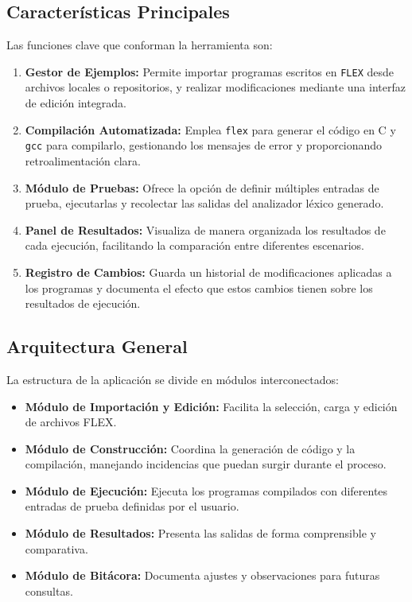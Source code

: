 \documentclass{article}
\begin{document}
\subsection*{Características Principales}

Las funciones clave que conforman la herramienta son:

\begin{enumerate}
    \item \textbf{Gestor de Ejemplos:} Permite importar programas escritos en \texttt{FLEX} desde archivos locales o repositorios, y realizar modificaciones mediante una interfaz de edición integrada.
    \item \textbf{Compilación Automatizada:} Emplea \texttt{flex} para generar el código en C y \texttt{gcc} para compilarlo, gestionando los mensajes de error y proporcionando retroalimentación clara.
    \item \textbf{Módulo de Pruebas:} Ofrece la opción de definir múltiples entradas de prueba, ejecutarlas y recolectar las salidas del analizador léxico generado.
    \item \textbf{Panel de Resultados:} Visualiza de manera organizada los resultados de cada ejecución, facilitando la comparación entre diferentes escenarios.
    \item \textbf{Registro de Cambios:} Guarda un historial de modificaciones aplicadas a los programas y documenta el efecto que estos cambios tienen sobre los resultados de ejecución.
\end{enumerate}

\subsection*{Arquitectura General}

La estructura de la aplicación se divide en módulos interconectados:

\begin{itemize}
    \item \textbf{Módulo de Importación y Edición:} Facilita la selección, carga y edición de archivos FLEX.
    \item \textbf{Módulo de Construcción:} Coordina la generación de código y la compilación, manejando incidencias que puedan surgir durante el proceso.
    \item \textbf{Módulo de Ejecución:} Ejecuta los programas compilados con diferentes entradas de prueba definidas por el usuario.
    \item \textbf{Módulo de Resultados:} Presenta las salidas de forma comprensible y comparativa.
    \item \textbf{Módulo de Bitácora:} Documenta ajustes y observaciones para futuras consultas.
\end{itemize}
\end{document}
